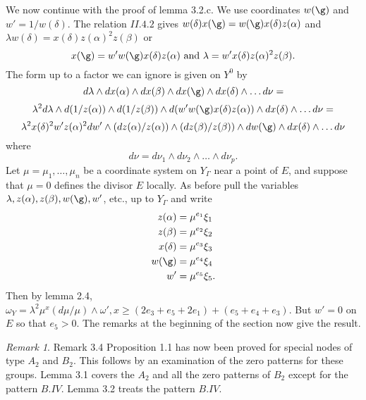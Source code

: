 \documentclass{memo-l}
\theoremstyle{definition}
\theoremstyle{remark}
\newtheorem{remark}[theorem]{Remark}
\numberwithin{section}{chapter}
\numberwithin{equation}{chapter}
\begin{document}
{\medskip}

   We now continue with the proof of lemma 3.2.c. 
 We use coordinates $w({\g})$ and $w' = 1/w({\delta})$. 
 The relation $II.4.2$ gives $w({\delta})x({\g}) = 
w({\g})x({\delta})z({\alpha})$ and ${\lambda}w({\delta}) = 
x({\delta})z({\alpha})^{2}z({\beta})$ or
$$
x({\g}) = w'w({\g})x({\delta})z({\alpha})\ {\text{and}}\ {\lambda} = 
w'x({\delta})z({\alpha})^{2}z({\beta}).
$$
The form up to a factor we can ignore is given on $Y^{0}$ by
$$
d{\lambda}\wedge dx({\alpha})\wedge dx({\beta})\wedge dx({\g})\wedge 
dx({\delta})\wedge \ldots d{\nu} =
$$ 
$$
{\lambda}^{2}d{\lambda}\wedge d(1/z({\alpha}))\wedge d(1/z({\beta}))\wedge  
d(w'w({\g})x({\delta})z({\alpha}))\wedge dx({\delta})\wedge \ldots d{\nu} =
$$
$$
{\lambda}^{2}x({\delta})^{2}w'z({\alpha})^{2}dw'\wedge (dz({\alpha})/z({\alpha}))
\wedge (dz({\beta})/z({\beta}))\wedge dw({\g})\wedge dx({\delta})\wedge  
\ldots d{\nu}
$$ 
where 
$$
d{\nu} = d{\nu}_{1}\wedge d{\nu}_{2}\wedge \ldots \wedge d{\nu}_{p}.
$$
Let ${\mu} = {\mu}_{1},\ldots ,{\mu}_{n}$ be a coordinate system on $Y_{{\Gamma}}$ 
near a point of $E$, and suppose that ${\mu} = 0$ defines the divisor $E$ locally. 
 As before pull the variables ${\lambda}, z({\alpha}), z({\beta}), 
w({\g}), w'$, etc., up to $Y_{{\Gamma}}$ and write
$$
\aligned
z({\alpha}) &= {\mu}^{e_1} {\xi}_{1} \\
z({\beta})  &= {\mu}^{e_2} {\xi}_{2} \\
x({\delta}) &= {\mu}^{e_3} {\xi}_{3} \\
w({\g}) &= {\mu}^{e_4} {\xi}_{4} \\
w' &= {\mu}^{e_5} {\xi}_5 .
\endaligned
$$
Then by lemma 2.4, ${\omega}_{Y} = {\lambda}^{2}{\mu}^{x}(d{\mu}/{\mu})
\wedge {\omega}', x \ge (2e_{3}+e_{5}+2e_{1}) + (e_{5}+e_{4}+e_{3})$. 
 But $w'= 0$ on $E$ so that $e_{5} > 0$. 
 The remarks at the beginning of the section now give the result.


\begin{remark}{Remark 3.4}   Proposition 1.1 has now been proved for special nodes 
of type $A_{2}$ and $B_{2}$. 
 This follows by an examination of the zero patterns for these groups. 
 Lemma 3.1 covers the $A_{2}$ and all the zero patterns of $B_{2}$ except 
for the pattern $B.IV$. 
 Lemma 3.2 treats the pattern $B.IV$.
 \end{remark}
\end{document}
